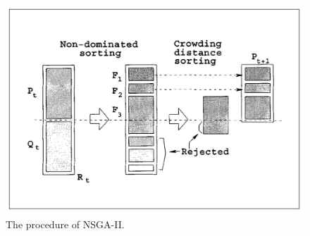 \documentclass[mscthesis, 11pt]{usiinfthesis}
\theoremstyle{newdefinition}
\begin{document}
\begin{figure}[ht]
    \centering
    \includegraphics[scale = 0.4]{literature_review/nsga2_procedure.png}
    \caption{The procedure of NSGA-II. \cite[~p. 186]{deb_fast_2002}}
    \label{fig:nsga2_procedure}
\end{figure}
\end{document}
